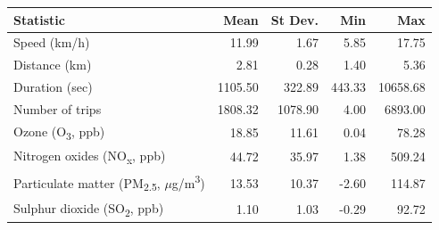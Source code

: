 \begin{tabular}{lrrrr}
\toprule
Statistic & Mean & St Dev. & Min & Max \\
\midrule
Speed (km/h) & 11.99 & 1.67 & 5.85 & 17.75 \\
Distance (km) & 2.81 & 0.28 & 1.40 & 5.36 \\
Duration (sec) & 1105.50 & 322.89 & 443.33 & 10658.68 \\
Number of trips & 1808.32 & 1078.90 & 4.00 & 6893.00 \\
Ozone (O\textsubscript{3}, ppb) & 18.85 & 11.61 & 0.04 & 78.28 \\
Nitrogen oxides (NO\textsubscript{x}, ppb) & 44.72 & 35.97 & 1.38 & 509.24 \\
Particulate matter (PM\textsubscript{2.5}, $\mu$g/m\textsuperscript{3}) & 13.53 & 10.37 & -2.60 & 114.87 \\
Sulphur dioxide (SO\textsubscript{2}, ppb) & 1.10 & 1.03 & -0.29 & 92.72 \\
\bottomrule
\end{tabular}
